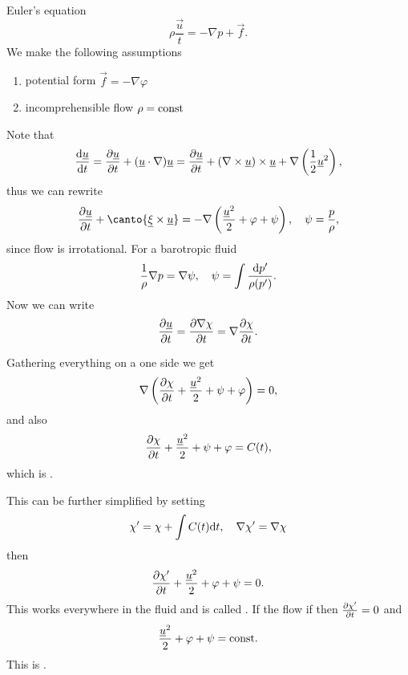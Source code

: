 \documentclass[../main.tex]{subfiles}
\begin{document}
  Euler's equation
  \begin{displaymath}
    \rho\dfrac{\vec u}{t} = - \nabla p + \vec f.
  \end{displaymath}
  We make the following assumptions
  \begin{enumerate}
    \item potential form $\vec f = - \nabla \varphi$
    \item incomprehensible flow $\rho = \textrm{const}$
  \end{enumerate}
  Note that
  \begin{displaymath}
    \frac{\mathrm{d} \underline{u}}{\mathrm{d} t} = \frac{\partial \underline{u}}{\partial t} + (\underline{u} \cdot \nabla ) \underline{u} 
    = \frac{\partial \underline{u}}{\partial t} + (\nabla \times \underline{u}) \times \underline{u} + \nabla \left( \frac{1}{2} \underline{u}^2 \right),
  \end{displaymath}
  thus we can rewrite
  \begin{displaymath}
    \ptf{\vec u}{t} + 
    \canto{\vec \xi \times \vec u}
    = - \nabla \left( \frac{\vec u^2}{2} + \varphi + \psi\right) , \quad \psi = \frac{p}{\rho},
  \end{displaymath}
  since flow is irrotational.
  For a barotropic fluid
  \begin{displaymath}
    \frac{1}{\rho} \nabla p = \nabla \psi, \quad \psi = \int\frac{\mathrm{d} p'}{\rho(p')}.
  \end{displaymath}
  Now we can write
  \begin{displaymath}
    \frac{\partial \underline{u}}{\partial t} = \frac{\partial \nabla \chi}{\partial t} = \nabla \frac{\partial \chi}{\partial t}.
  \end{displaymath}
  
  Gathering everything on a one side we get
  \begin{displaymath}
    \nabla \left( \frac{\partial \chi}{\partial t} + \frac{\underline{u}^2}{2} + \psi + \varphi \right) = 0,
  \end{displaymath}
  and also
  \begin{displaymath}
    \frac{\partial \chi}{\partial t} + \frac{\underline{u}^2}{2} + \psi + \varphi  = C(t),
  \end{displaymath}
  which is .

  This can be further simplified by setting
  \begin{displaymath}
    \chi' = \chi + \int C(t) \mathrm{d} t, \quad \nabla \chi' = \nabla \chi
  \end{displaymath}
  then
  \begin{displaymath}
    \frac{\partial \chi'}{\partial t} + \frac{\underline{u}^2}{2} + \varphi + \psi = 0.
  \end{displaymath}
  This works everywhere in the fluid and is called .
  If the flow if  then $\frac{\partial \chi'}{\partial t} = 0$ and
  \begin{displaymath}
    \frac{\underline{u}^2}{2} + \varphi + \psi = \textrm{const}.
  \end{displaymath}
  This is .
\end{document}
